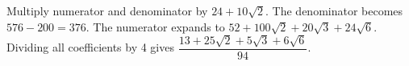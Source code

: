 Multiply numerator and denominator by $24+10\sqrt 2$. The denominator becomes $576-200=376$. The numerator expands to $52+100\sqrt 2+20\sqrt 3+24\sqrt 6$. Dividing all coefficients by 4 gives $\boxed{\dfrac{13+25\sqrt 2+5\sqrt 3+6\sqrt 6}{94}}$.
